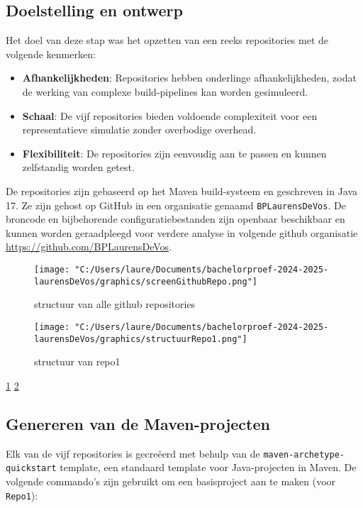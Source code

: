 \subsection{Doelstelling en ontwerp}
Het doel van deze stap was het opzetten van een reeks repositories met de volgende kenmerken:
\begin{itemize}
    \item \textbf{Afhankelijkheden}: Repositories hebben onderlinge afhankelijkheden, zodat de werking van complexe build-pipelines kan worden gesimuleerd.
    \item \textbf{Schaal}: De vijf repositories bieden voldoende complexiteit voor een representatieve simulatie zonder overbodige overhead.
    \item \textbf{Flexibiliteit}: De repositories zijn eenvoudig aan te passen en kunnen zelfstandig worden getest.
\end{itemize}

De repositories zijn gebaseerd op het Maven build-systeem en geschreven in Java 17. Ze zijn gehost op GitHub in een organisatie genaamd \texttt{BPLaurensDeVos}. De broncode en bijbehorende configuratiebestanden zijn openbaar beschikbaar en kunnen worden geraadpleegd voor verdere analyse in volgende github organisatie \url{https://github.com/BPLaurensDeVos}.

\begin{figure}[h!]
    \centering
    \texttt{[image: "C:/Users/laure/Documents/bachelorproef-2024-2025-laurensDeVos/graphics/screenGithubRepo.png"]}
    \caption{structuur van alle github repositories}
    \label{fig:repositories}
\end{figure}

\begin{figure}[h!]
    \centering
    \texttt{[image: "C:/Users/laure/Documents/bachelorproef-2024-2025-laurensDeVos/graphics/structuurRepo1.png"]}
    \caption{structuur van repo1}
    \label{fig:structuur}
\end{figure}

\ref{fig:repositories}
\ref{fig:structuur}

\subsection{Genereren van de Maven-projecten}
Elk van de vijf repositories is gecreëerd met behulp van de \texttt{maven-archetype-quickstart} template, een standaard template voor Java-projecten in Maven. De volgende commando's zijn gebruikt om een basisproject aan te maken (voor \texttt{Repo1}):

